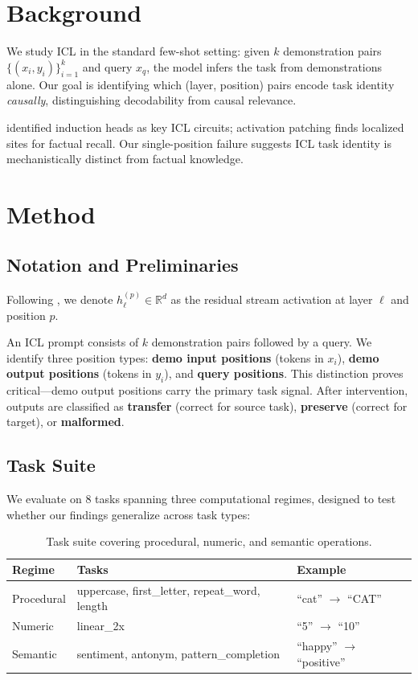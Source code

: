 \documentclass{article}
\begin{document}
\section{Background}
\label{sec:background}

We study ICL in the standard few-shot setting: given $k$ demonstration pairs $\{(x_i, y_i)\}_{i=1}^k$ and query $x_q$, the model infers the task from demonstrations alone. Our goal is identifying which (layer, position) pairs encode task identity \emph{causally}, distinguishing decodability from causal relevance.

\citet{olsson2022context} identified induction heads as key ICL circuits; activation patching \citep{vig2020investigating,meng2022locating} finds localized sites for factual recall. Our single-position failure suggests ICL task identity is mechanistically distinct from factual knowledge.

\section{Method}
\label{sec:method}

\subsection{Notation and Preliminaries}

Following \citet{elhage2021mathematical}, we denote $h_\ell^{(p)} \in \mathbb{R}^d$ as the residual stream activation at layer $\ell$ and position $p$.

An ICL prompt consists of $k$ demonstration pairs followed by a query. We identify three position types: \textbf{demo input positions} (tokens in $x_i$), \textbf{demo output positions} (tokens in $y_i$), and \textbf{query positions}. This distinction proves critical---demo output positions carry the primary task signal. After intervention, outputs are classified as \textbf{transfer} (correct for source task), \textbf{preserve} (correct for target), or \textbf{malformed}.

\subsection{Task Suite}

We evaluate on 8 tasks spanning three computational regimes, designed to test whether our findings generalize across task types:

\begin{table}[h]
\centering
\small
\begin{tabular}{@{}lll@{}}
\toprule
\textbf{Regime} & \textbf{Tasks} & \textbf{Example} \\
\midrule
Procedural & uppercase, first\_letter, repeat\_word, length & ``cat'' $\rightarrow$ ``CAT'' \\
Numeric & linear\_2x & ``5'' $\rightarrow$ ``10'' \\
Semantic & sentiment, antonym, pattern\_completion & ``happy'' $\rightarrow$ ``positive'' \\
\bottomrule
\end{tabular}
\caption{Task suite covering procedural, numeric, and semantic operations.}
\label{tab:tasks}
\end{table}
\end{document}
